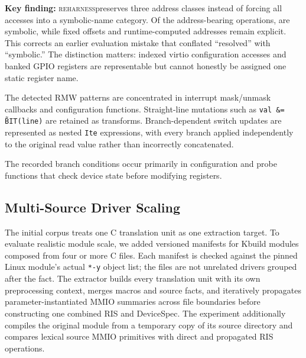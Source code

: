 \documentclass[sigplan, screen, review, anonymous]{acmart}
\newcommand{\reharness}{\textsc{reharness}}
\begin{document}
\textbf{Key finding:} \reharness preserves three address classes instead of forcing all accesses into a symbolic-name category. Of the address-bearing operations, \EvalSymbolicPct{} are symbolic, while fixed offsets and runtime-computed addresses remain explicit. This corrects an earlier evaluation mistake that conflated ``resolved'' with ``symbolic.'' The distinction matters: indexed virtio configuration accesses and banked GPIO registers are representable but cannot honestly be assigned one static register name.

The \EvalRMW{} detected RMW patterns are concentrated in interrupt mask/unmask callbacks and configuration functions. Straight-line mutations such as \texttt{val \&= \~BIT(line)} are retained as transforms. Branch-dependent switch updates are represented as nested \texttt{Ite} expressions, with every branch applied independently to the original read value rather than incorrectly concatenated.

The \EvalConditions{} recorded branch conditions occur primarily in configuration and probe functions that check device state before modifying registers.

\subsection{Multi-Source Driver Scaling}

The initial corpus treats one C translation unit as one extraction target. To evaluate realistic module scale, we added versioned manifests for Kbuild modules composed from four or more C files. Each manifest is checked against the pinned Linux module's actual \texttt{*-y} object list; the files are not unrelated drivers grouped after the fact. The extractor builds every translation unit with its own preprocessing context, merges macros and source facts, and iteratively propagates parameter-instantiated MMIO summaries across file boundaries before constructing one combined RIS and DeviceSpec. The experiment additionally compiles the original module from a temporary copy of its source directory and compares lexical source MMIO primitives with direct and propagated RIS operations.

\begin{table}[t]
\centering
\caption{Real multi-source Linux driver modules. X-TU is the number of resolved cross-translation-unit call edges and Prop is the number of call edges carrying MMIO summaries. H/B/L reports generated-backend compilation. $\dagger$ denotes a successful original Kbuild compile/link after warning-only modpost retry because the fixed experiment kernel omits USB core exports.}
\label{tab:multisource}
\resizebox{\columnwidth}{!}{\MultiSourceResultsTable}
\end{table}
\end{document}
